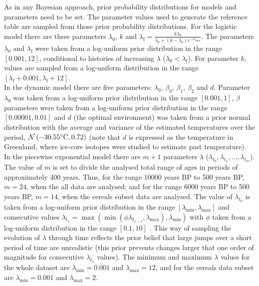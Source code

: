 \documentclass[a4paper]{article}
\begin{document}
As in any Bayesian approach, prior probability distributions for models and parameters need to be set. The parameter values used to generate the reference table are sampled from those prior probability distributions. For the logistic model there are three parameters $\lambda_0$, $k$ and $\lambda_\mathrm{f}=\frac{k\lambda_0}{\lambda_0+(k-\lambda_0)e^{-rt_{\max}}}$. The parameters $\lambda_0$ and $\lambda_\mathrm{f}$ were taken from a log-uniform prior distribution in the range $\left[ 0.001,12\right]$, conditional to histories of increasing $\lambda$ ($\lambda_0 < \lambda_\mathrm{f}$). For parameter $k$, values are sampled from a log-uniform distribution in the range $\left[\lambda_\mathrm{f}+0.001,\lambda_\mathrm{f}+12\right]$.
\\

In the dynamic model there are five parameters: $\lambda_0$, $\beta_0$, $\beta_1$, $\beta_2$ and $d$. Parameter $\lambda_0$ was taken from a log-uniform prior distribution in the range $\left[ 0.001,1\right]$, $\beta$ parameters were taken from a log-uniform prior distribution in the range $\left[ 0.00001,0.01\right]$ and $d$ (the optimal environment) was taken from a prior normal distribution with the average and variance of the estimated temperatures over the period, $\mathcal{N}\left(-30.55\mathrm{\degree C},0.72\right)$ (note that $d$ is expressed as the temperature in Greenland, where ice-core isotopes were studied to estimate past temperature).
\\



In the piecewise exponential model there are $m+1$ parameters $\lambda$ ($\lambda_{t_0},\lambda_{t_1},\dots ,\lambda_{t_{m}}$). The value of $m$ is set to divide the analysed total range of ages in periods of approximately 400 years. Thus, for the range 10000 years BP to 500 years BP, $m=24$, when the all data are analysed; and for the range 6000 years BP to 500 years BP, $m=14$, when the cereals subset data are analysed. The value of $\lambda_{t_0}$ is taken from a log-uniform prior distribution in the range $\left[\lambda_{\min},\lambda_{\max}\right]$ and consecutive values $\lambda_{t_x}=\max(\min(\phi\lambda_{t_{x-1}},\lambda_{\max}),\lambda_{\min})$ with $\phi$ taken from a log-uniform distribution in the range $\left[0.1,10\right]$ \parencite[as in][]{Boitard2016}. This way of sampling the evolution of $\lambda$ through time reflects the prior belief that large jumps over a short period of time are unrealistic (this prior prevents changes larger that one order of magnitude for consecutive $\lambda_{t_x}$ values). The minimum and maximum  $\lambda$ values for the whole dataset are $\lambda_{\min}=0.001$ and $\lambda_{\max}=12$, and for the cereals data subset are $\lambda_{\min}=0.001$ and $\lambda_{\max}=2$.
\\
\end{document}
